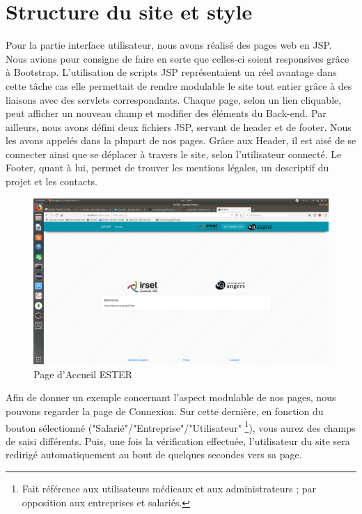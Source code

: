 \section{Structure du site et style}


Pour la partie interface utilisateur, nous avons réalisé des pages web en JSP. Nous avions pour consigne de faire en sorte que celles-ci soient responsives grâce à Bootstrap. L'utilisation de scripts JSP représentaient un réel avantage dans cette tâche cas elle permettait de rendre modulable le site tout entier grâce à des liaisons avec des servlets correspondants. Chaque page, selon un lien cliquable, peut afficher un nouveau champ et modifier des éléments du Back-end. Par ailleurs, nous avons défini deux fichiers JSP, servant de header et de footer. Nous les avons appelés dans la plupart de nos pages. Grâce aux Header, il est aisé de se connecter ainsi que se déplacer à travers le site, selon l'utilisateur connecté. Le Footer, quant à lui, permet de trouver les mentions légales, un descriptif du projet et les contacts.

\begin{figure}[ht]
    \begin{center}
	\includegraphics[scale=0.2,trim=4cm 0cm 4cm 5.3cm, clip=true]{img/ESTER}
    \end{center}
    \caption{Page d'Accueil ESTER}
\end{figure}

Afin de donner un exemple concernant l'aspect modulable de nos pages, nous pouvons regarder la page de Connexion. Sur cette dernière, en fonction du bouton sélectionné ("Salarié"/"Entreprise"/"Utilisateur" \footnote{Fait référence aux utilisateurs médicaux et aux administrateurs ; par opposition aux entreprises et salariés.}), vous aurez des champs de saisi différents. Puis, une fois la vérification effectuée, l'utilisateur du site sera redirigé automatiquement au bout de quelques secondes vers sa page.

